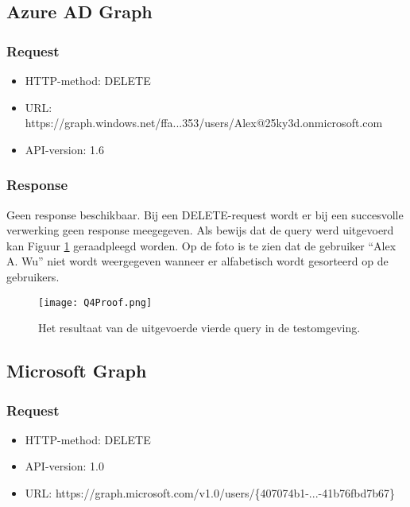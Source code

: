 \subsection{Azure AD Graph}

\subsubsection{Request}

\begin{itemize}
    \item \Ac{HTTP}-method: DELETE
    \item \ac{URL}: https://graph.windows.net/ffa...353/users/Alex@25ky3d.onmicrosoft.com
    \item \Ac{API}-version: 1.6
\end{itemize}

\subsubsection{Response}

Geen response beschikbaar. Bij een DELETE-request wordt er bij een succesvolle verwerking geen response meegegeven. Als bewijs dat de query werd uitgevoerd kan Figuur \ref{Q4Proof} geraadpleegd worden. Op de foto is te zien dat de gebruiker “Alex A. Wu” niet wordt weergegeven wanneer er alfabetisch wordt gesorteerd op de gebruikers. \\ 

\begin{figure}[h]
    \texttt{[image: Q4Proof.png]}
    \caption[Query 4: Bewijs van uitvoering]{Het resultaat van de uitgevoerde vierde query in de testomgeving.}
    \label{Q4Proof}
\end{figure}

\subsection{Microsoft Graph}

\subsubsection{Request}

\begin{itemize}
    \item \Ac{HTTP}-method: DELETE
    \item \ac{API}-version: 1.0
    \item \Ac{URL}: https://graph.microsoft.com/v1.0/users/\{407074b1-...-41b76fbd7b67\}
\end{itemize}

